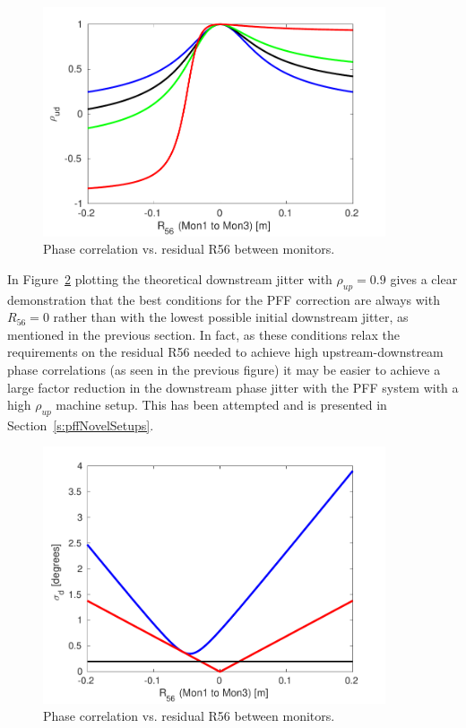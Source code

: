 \begin{figure}
  \centering
  \includegraphics[width=0.9\textwidth]{Figures/propagation/corrVsR56_CTENCorr}
  \caption{Phase correlation vs. residual R56 between monitors.}
  \label{f:corrVsR56_CTENCorr}
\end{figure}

In Figure~\ref{f:jitVsR56_90ctencorr} plotting the theoretical downstream jitter with \(\rho_{up} = 0.9\) gives a clear demonstration that the best conditions for the PFF correction are always with \(R_{56} = 0\) rather than with the lowest possible initial downstream jitter, as mentioned in the previous section. In fact, as these conditions relax the requirements on the residual R56 needed to achieve high upstream-downstream phase correlations (as seen in the previous figure) it may be easier to achieve a large factor reduction in the downstream phase jitter with the PFF system with a high \(\rho_{up}\) machine setup. This has been attempted and is presented in Section~\ref{s:pffNovelSetups}.

\begin{figure}
  \centering
  \includegraphics[width=0.9\textwidth]{Figures/propagation/jitVsR56_90ctencorr}
  \caption{Phase correlation vs. residual R56 between monitors.}
  \label{f:jitVsR56_90ctencorr}
\end{figure}

